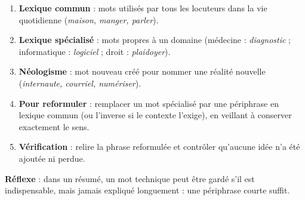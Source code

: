 \documentclass[11pt]{article}
\begin{document}
\begin{methode}
\begin{enumerate}
\item \textbf{Lexique commun} : mots utilisés par tous les locuteurs dans la vie quotidienne (\emph{maison, manger, parler}).
\item \textbf{Lexique spécialisé} : mots propres à un domaine (médecine : \emph{diagnostic} ; informatique : \emph{logiciel} ; droit : \emph{plaidoyer}).
\item \textbf{Néologisme} : mot nouveau créé pour nommer une réalité nouvelle (\emph{internaute, courriel, numériser}).
\item \textbf{Pour reformuler} : remplacer un mot spécialisé par une périphrase en lexique commun (ou l'inverse si le contexte l'exige), en veillant à conserver exactement le sens.
\item \textbf{Vérification} : relire la phrase reformulée et contrôler qu'aucune idée n'a été ajoutée ni perdue.
\end{enumerate}
\textbf{Réflexe} : dans un résumé, un mot technique peut être gardé s'il est indispensable, mais jamais expliqué longuement : une périphrase courte suffit.
\end{methode}
\end{document}
